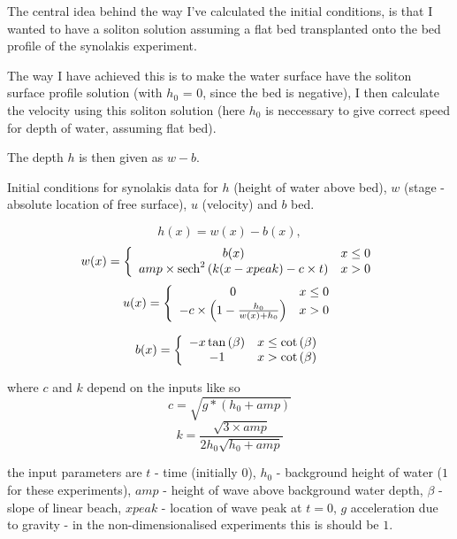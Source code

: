 \documentclass[12pt]{article}
\begin{document}
The central idea behind the way I've calculated the initial conditions, is that I wanted to have a soliton solution assuming a flat bed transplanted onto the bed profile of the synolakis experiment.

The way I have achieved this is to make the water surface have the soliton surface profile solution (with $h_0$ = 0, since the bed is negative), I then calculate the velocity using this soliton solution (here $h_0$ is neccessary to give correct speed for depth of water, assuming flat bed).

The depth $h$ is then given as $w - b$.	
	
Initial conditions for synolakis data for $h$ (height of water above bed), $w$ (stage - absolute location of free surface), $u$ (velocity) and $b$ bed.


\[h(x) = w(x) - b(x),\]
\[w(x) = \left\{ \begin{array}{c c}
b(x) &  x \le 0 \\
amp\times \text{sech}^2\left( k (x - xpeak) - c\times t \right) &  x > 0
\end{array}
\right. \]
\[u(x) = \left\{ \begin{array}{c c}
0 &  x \le 0 \\
-c \times \left(  1 -\frac{h_0}{w(x) + h_0}\right) &  x > 0
\end{array}
\right. \]

\[b(x) = \left\{ \begin{array}{c c}
-x \tan\left(\beta\right) &  x \le \text{cot}\left(\beta\right) \\
-1 &  x > \text{cot}\left(\beta\right)
\end{array}
\right. \]

where $c$ and $k$ depend on the inputs like so
\[c = \sqrt{g*(h_0 + amp)}\]
\[k = \frac{\sqrt{3 \times amp}}{2 h_0 \sqrt{h_0 + amp}} \]

the input parameters are $t$ - time (initially 0), $h_0$ - background height of water ($1$ for these experiments), $amp$ - height of wave above background water depth,
$\beta$ - slope of linear beach, $xpeak$ - location of wave peak at $t = 0$, $g$ acceleration due to gravity - in the non-dimensionalised experiments this is should be $1$. 
\end{document}
